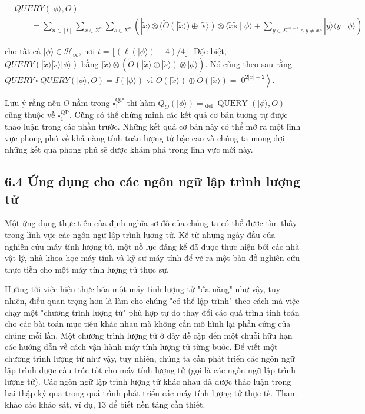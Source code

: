 \documentclass[10pt]{article}
\begin{document}
\begin{enumerate}
$$
\begin{aligned}
& Q U E R Y(|\phi\rangle, O) \\
& \qquad=\sum_{n \in[t]} \sum_{x \in \Sigma^{n}} \sum_{s \in \Sigma^{n}}\left(|\tilde{x}\rangle \otimes(\tilde{O}(|\tilde{x}\rangle) \oplus|\tilde{s}\rangle) \otimes\langle\tilde{x} \tilde{s} \mid \phi\rangle+\sum_{y \in \Sigma^{4 n+4} \wedge y \neq \tilde{x} \tilde{s}}|y\rangle\langle y \mid \phi\rangle\right)
\end{aligned}
$$

cho tất cả $|\phi\rangle \in \mathcal{H}_{\infty}$, nơi $t=\lfloor(\ell(|\phi\rangle)-4) / 4\rfloor$. Đặc biệt, $Q U E R Y(|\tilde{x}\rangle|\tilde{s}\rangle|\phi\rangle)$ bằng $|\tilde{x}\rangle \otimes(\tilde{O}(|\tilde{x}\rangle \oplus|\tilde{s}\rangle) \otimes|\phi\rangle)$. Nó cũng theo sau rằng $Q U E R Y \circ Q U E R Y(|\phi\rangle, O)=I(|\phi\rangle)$ vì $\tilde{O}(|\tilde{x}\rangle) \oplus \tilde{O}(|\tilde{x}\rangle)=\left|0^{2|x|+2}\right\rangle$.

Lưu ý rằng nếu $O$ nằm trong $\square_{1}^{\mathrm{QP}}$ thì hàm $Q_{O}(|\phi\rangle)={ }_{\text {def }} \operatorname{QUERY}(|\phi\rangle, O)$ cũng thuộc về $\square_{1}^{\mathrm{QP}}$. Cũng có thể chứng minh các kết quả cơ bản tương tự được thảo luận trong các phần trước. Những kết quả cơ bản này có thể mở ra một lĩnh vực phong phú về khả năng tính toán lượng tử bậc cao và chúng ta mong đợi những kết quả phong phú sẽ được khám phá trong lĩnh vực mới này.

\subsection*{6.4 Ứng dụng cho các ngôn ngữ lập trình lượng tử}
Một ứng dụng thực tiễn của định nghĩa sơ đồ của chúng ta có thể được tìm thấy trong lĩnh vực các ngôn ngữ lập trình lượng tử. Kể từ những ngày đầu của nghiên cứu máy tính lượng tử, một nỗ lực đáng kể đã được thực hiện bởi các nhà vật lý, nhà khoa học máy tính và kỹ sư máy tính để vẽ ra một bản đồ nghiên cứu thực tiễn cho một máy tính lượng tử thực sự.

Hướng tới việc hiện thực hóa một máy tính lượng tử "đa năng" như vậy, tuy nhiên, điều quan trọng hơn là làm cho chúng "có thể lập trình" theo cách mà việc chạy một "chương trình lượng tử" phù hợp tự do thay đổi các quá trình tính toán cho các bài toán mục tiêu khác nhau mà không cần mô hình lại phần cứng của chúng mỗi lần. Một chương trình lượng tử ở đây đề cập đến một chuỗi hữu hạn các hướng dẫn về cách vận hành máy tính lượng tử từng bước. Để viết một chương trình lượng tử như vậy, tuy nhiên, chúng ta cần phát triển các ngôn ngữ lập trình được cấu trúc tốt cho máy tính lượng tử (gọi là các ngôn ngữ lập trình lượng tử). Các ngôn ngữ lập trình lượng tử khác nhau đã được thảo luận trong hai thập kỷ qua trong quá trình phát triển các máy tính lượng tử thực tế. Tham khảo các khảo sát, ví dụ, 13 để biết nền tảng cần thiết.


\end{enumerate}
\end{document}
